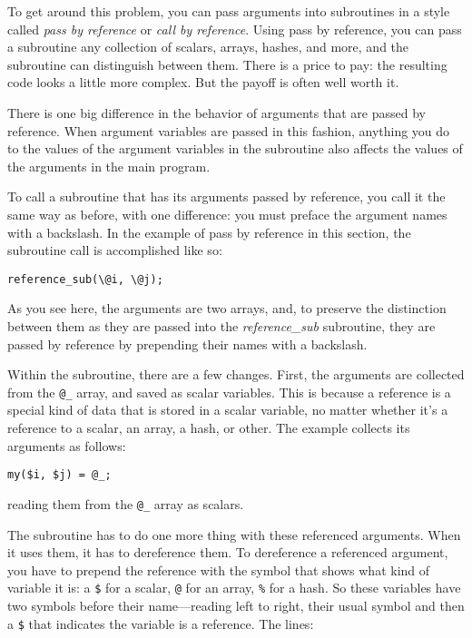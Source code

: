 To get around this problem, you can pass arguments into subroutines in a style called \textit{pass by reference} or \textit{call by reference}. Using pass by reference, you can pass a subroutine any collection of scalars, arrays, hashes, and more, and the subroutine can distinguish between them. There is a price to pay: the resulting code looks a little more complex. But the payoff is often well worth it.

There is one big difference in the behavior of arguments that are passed by reference. When argument variables are passed in this fashion, anything you do to the values of the argument variables in the subroutine also affects the values of the arguments in the main program.

To call a subroutine that has its arguments passed by reference, you call it the same way as before, with one difference: you must preface the argument names with a backslash. In the example of pass by reference in this section, the subroutine call is accomplished like so:

\begin{lstlisting}
reference_sub(\@i, \@j);
\end{lstlisting}

As you see here, the arguments are two arrays, and, to preserve the distinction between them as they are passed into the \textit{reference\_sub} subroutine, they are passed by reference by prepending their names with a backslash.

Within the subroutine, there are a few changes. First, the arguments are collected from the \verb|@_| array, and saved as scalar variables. This is because a reference is a special kind of data that is stored in a scalar variable, no matter whether it's a reference to a scalar, an array, a hash, or other. The example collects its arguments as follows:

\begin{lstlisting}
my($i, $j) = @_;
\end{lstlisting}

reading them from the \verb|@_| array as scalars.

The subroutine has to do one more thing with these referenced arguments. When it uses them, it has to dereference them. To dereference a referenced argument, you have to prepend the reference with the symbol that shows what kind of variable it is: a \verb|$| for a scalar, \verb|@| for an array, \verb|%| for a hash. So these variables have two symbols before their name—reading left to right, their usual symbol and then a \verb|$| that indicates the variable is a reference. The lines:

